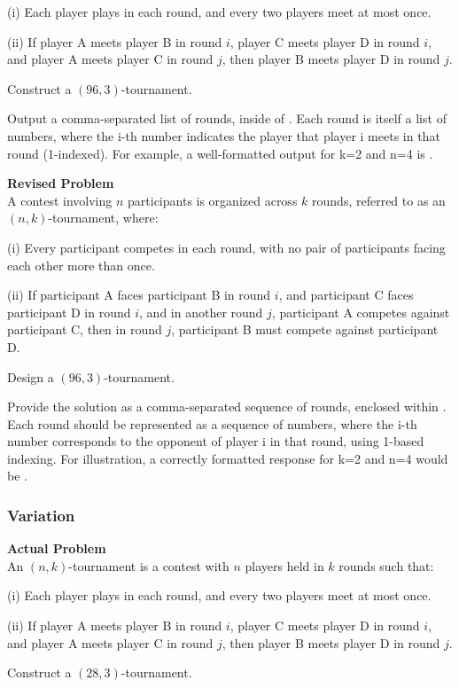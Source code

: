 (i) Each player plays in each round, and every two players meet at most once.

(ii) If player A meets player B in round $i$, player C meets player D in round $i$, and player A
meets player C in round $j$, then player B meets player D in round $j$.

Construct a $(96, 3)$-tournament. 


Output a comma-separated list of rounds, inside of \boxed. Each round is itself a list of numbers, where the i-th number indicates the player that player i meets in that round (1-indexed). For example, a well-formatted output for k=2 and n=4 is .

\textbf{Revised Problem}\\
A contest involving $n$ participants is organized across $k$ rounds, referred to as an $(n, k)$-tournament, where:

(i) Every participant competes in each round, with no pair of participants facing each other more than once.

(ii) If participant A faces participant B in round $i$, and participant C faces participant D in round $i$, and in another round $j$, participant A competes against participant C, then in round $j$, participant B must compete against participant D.

Design a $(96, 3)$-tournament.

Provide the solution as a comma-separated sequence of rounds, enclosed within \boxed. Each round should be represented as a sequence of numbers, where the i-th number corresponds to the opponent of player i in that round, using 1-based indexing. For illustration, a correctly formatted response for k=2 and n=4 would be .

\subsubsection{Variation}
\textbf{Actual Problem}\\
An $(n, k)$-tournament is a contest with $n$ players held in $k$ rounds such that:

(i) Each player plays in each round, and every two players meet at most once.

(ii) If player A meets player B in round $i$, player C meets player D in round $i$, and player A
meets player C in round $j$, then player B meets player D in round $j$.

Construct a $(28, 3)$-tournament. 


